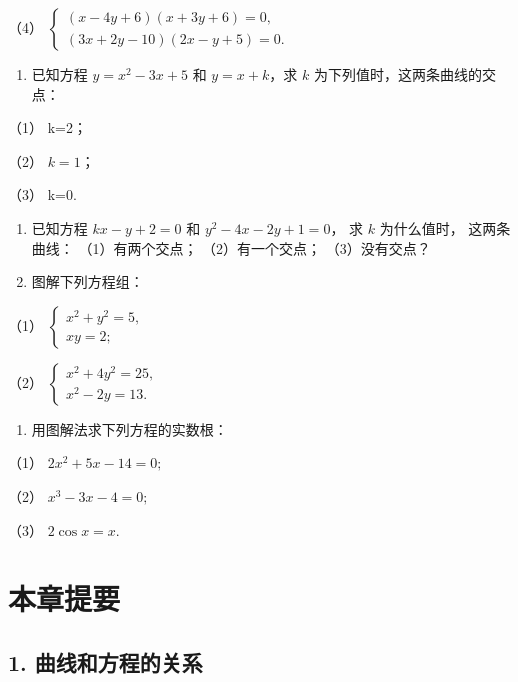 （4）
\(\left\{ \begin{array}{l} (x - 4y + 6)(x + 3y + 6) = 0, \\ (3x + 2y - 10)(2x - y + 5) = 0. \end{array} \right.\)

\begin{enumerate}
\def\labelenumi{\arabic{enumi}.}
\setcounter{enumi}{1}
\tightlist
\item
  已知方程 \(y = x^2 - 3x + 5\) 和 \(y = x + k\)，求 \(k\)
  为下列值时，这两条曲线的交点：
\end{enumerate}

（1） k=2；

（2） \(k = 1\)；

（3） k=0.

\begin{enumerate}
\def\labelenumi{\arabic{enumi}.}
\setcounter{enumi}{2}
\item
  已知方程 \(kx - y + 2 = 0\) 和 \(y^{2} - 4x - 2y + 1 = 0\)， 求 \(k\)
  为什么值时， 这两条曲线： （1）有两个交点； （2）有一个交点；
  （3）没有交点？
\item
  图解下列方程组：
\end{enumerate}

（1）
\(\left\{ \begin{array}{l} x^{2} + y^{2} = 5, \\ xy = 2; \end{array} \right.\)

（2）
\(\left\{ \begin{array}{l} x^{2} + 4y^{2} = 25, \\ x^{2} - 2y = 13. \end{array} \right.\)

\begin{enumerate}
\def\labelenumi{\arabic{enumi}.}
\setcounter{enumi}{4}
\tightlist
\item
  用图解法求下列方程的实数根：
\end{enumerate}

（1） \(2x^{2} + 5x - 14 = 0;\)

（2） \(x^{3} - 3x - 4 = 0;\)

（3） \(2\cos x = x.\)

\section{本章提要}\label{ux672cux7ae0ux63d0ux8981-1}

\subsection{1.
曲线和方程的关系}\label{ux66f2ux7ebfux548cux65b9ux7a0bux7684ux5173ux7cfb-1}

